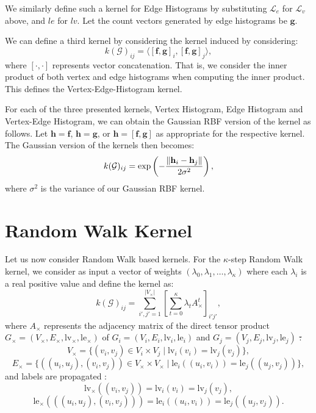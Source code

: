 We similarly define such a kernel for Edge Histograms by substituting
$\mathcal{L}_e$ for $\mathcal{L}_v$ above, and $le$ for $lv$. Let the count
vectors generated by edge histograms be $\mathbf{g}$.

We can define a third kernel by considering the kernel induced by considering:
\begin{equation}
    k(\mathcal{G})_{ij} = \langle[\mathbf{f},\mathbf{g}]_i, [\mathbf{f},\mathbf{g}]_j\rangle,
\end{equation}
%
where $[\cdot,\cdot]$ represents vector concatenation. That is, we consider the
inner product of both vertex and edge histograms when computing the inner
product. This defines the Vertex-Edge-Histogram kernel.

For each of the three presented kernels, Vertex Histogram, Edge Histogram and
Vertex-Edge Histogram, we can obtain the Gaussian RBF version of the kernel as
follows. Let $\mathbf{h} = \mathbf{f}$, $\mathbf{h} = \mathbf{g}$, or
$\mathbf{h} = \mathbf{[\mathbf{f}, \mathbf{g}]}$ as appropriate for the
respective kernel. The Gaussian version of the kernels then becomes:
\begin{equation}
    k(\mathcal{G})_{ij} = \text{exp}\left(-\frac{\lVert\mathbf{h}_i - \mathbf{h}_j\rVert}{2\sigma^2}\right),
\end{equation}
%
where $\sigma^2$ is the variance of our Gaussian RBF kernel.


\section{Random Walk Kernel}
\label{appendix:graph_kernels:random_walk}

Let us now consider Random Walk based kernels. For the $\kappa$-step Random Walk
kernel, we consider as input a vector of weights $(\lambda_0, \lambda_1, \dots,
\lambda_\kappa)$ where each $\lambda_i$ is a real positive value and define the
kernel as:
\begin{equation}
    k(\mathcal{G})_{ij} = \sum\limits_{i',j'=1}^{|V_{\times}|}\left[\sum\limits_{t=0}^{\kappa}\lambda_tA_{\times}^{t}\right]_{i'j'},
\end{equation}
%
where $A_{\times}$ represents the adjacency matrix of the direct tensor product
$G_{\times} = (V_{\times}, E_{\times}, \text{lv}_{\times}, \text{le}_{\times})$
of $G_i = (V_i, E_i, \text{lv}_i, \text{le}_i)$ and $G_j = (V_j, E_j,
\text{lv}_j, \text{le}_j)$ \st:
\[
V_{\times} = \{ (v_i, v_j) \in V_i \times V_j \mid \text{lv}_i(v_i) = \text{lv}_j(v_j) \},
\]
\[
E_{\times} = \{ ((u_i, u_j), (v_i, v_j)) \in V_{\times} \times V_{\times} \mid \text{le}_i((u_i, v_i)) = \text{le}_j((u_j, v_j)) \},
\]
%
and labels are propagated \ie:
\[
\text{lv}_{\times}((v_i, v_j)) = \text{lv}_i(v_i) = \text{lv}_j(v_j),
\]
\[
\text{le}_{\times}(((u_i, u_j), (v_i, v_j))) = \text{le}_i((u_i, v_i)) = \text{le}_j((u_j, v_j)).
\]


